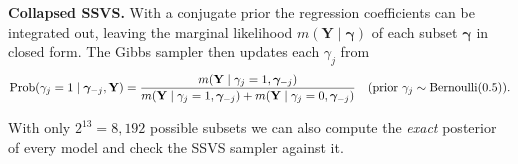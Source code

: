 \documentclass[11pt]{article}
\begin{document}
\begin{recall}
\textbf{Collapsed SSVS.} With a conjugate prior the regression coefficients can be integrated out, leaving the marginal likelihood $m(\mathbf Y\mid\bm\gamma)$ of each subset $\bm\gamma$ in closed form. The Gibbs sampler then updates each $\gamma_j$ from
\[
\mathrm{Prob}(\gamma_j=1\mid\bm\gamma_{-j},\mathbf Y)=\frac{m(\mathbf Y\mid\gamma_j=1,\bm\gamma_{-j})}{m(\mathbf Y\mid\gamma_j=1,\bm\gamma_{-j})+m(\mathbf Y\mid\gamma_j=0,\bm\gamma_{-j})}\quad(\text{prior }\gamma_j\sim\mathrm{Bernoulli}(0.5)).
\]
\end{recall}

\begin{keyidea}
With only $2^{13}=8{,}192$ possible subsets we can also compute the \emph{exact} posterior of every model and check the SSVS sampler against it.
\end{keyidea}
\end{document}
